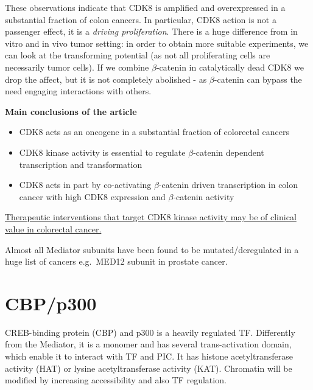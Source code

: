 These observations indicate that CDK8 is amplified and overexpressed in a substantial fraction of colon cancers. In particular, CDK8 action is not a passenger effect, it is a \emph{driving proliferation}. There is a huge difference from in vitro and in vivo tumor setting: in order to obtain more suitable experiments, we can look at the transforming potential (as not all proliferating cells are necessarily tumor cells). If we combine $\beta$-catenin in catalytically dead CDK8 we drop the affect, but it is not completely abolished - as $\beta$-catenin can bypass the need engaging interactions with others.

\textbf{Main conclusions of the article}

\begin{itemize}
\tightlist
\item
  CDK8 acts as an oncogene in a substantial fraction of colorectal cancers
\item
  CDK8 kinase activity is essential to regulate $\beta$-catenin dependent transcription and transformation
\item
  CDK8 acts in part by co-activating $\beta$-catenin driven transcription in colon cancer with high CDK8 expression and $\beta$-catenin activity
\end{itemize}

\underline{Therapeutic interventions that target CDK8 kinase activity may be of clinical value in colorectal cancer.}

Almost all Mediator subunits have been found to be mutated/deregulated in a huge list of cancers e.g.~MED12 subunit in prostate cancer.


\hypertarget{cbpp300}{%
\section{CBP/p300}\label{cbpp300}}

CREB-binding protein (CBP) and p300 is a heavily regulated TF. Differently from the Mediator, it is a monomer and has several trans-activation domain, which enable it to interact with TF and PIC. It has histone acetyltransferase activity (HAT) or lysine acetyltransferase activity (KAT). Chromatin will be modified by increasing accessibility and also TF regulation.

